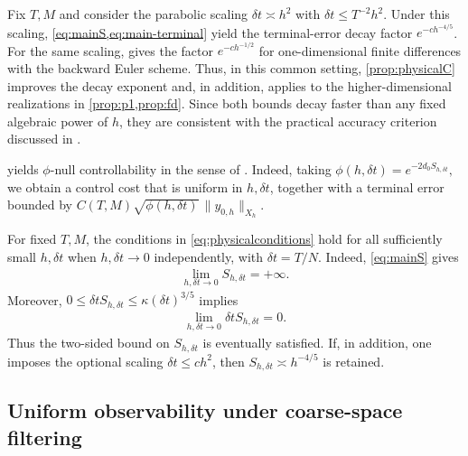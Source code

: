 \documentclass[print,wide,eng]{draft}
\begin{document}
%
\begin{remark}\label{rem:fully-discrete-comparison}
Fix $T,M$ and consider the parabolic scaling $\delta t\asymp h^2$ with $\delta t\le T^{-2}h^2$. Under this scaling, \cref{eq:mainS,eq:main-terminal} yield the terminal-error decay factor $e^{-ch^{-4/5}}$. For the same scaling, \cite[Proposition~3.1 and Theorem~1.10]{GCH} gives the factor $e^{-ch^{-1/2}}$ for one-dimensional finite differences with the backward Euler scheme. Thus, in this common setting, \cref{prop:physicalC} improves the decay exponent and, in addition, applies to the higher-dimensional realizations in \cref{prop:p1,prop:fd}. Since both bounds decay faster than any fixed algebraic power of $h$, they are consistent with the practical accuracy criterion discussed in \cite[Remark~4.4]{Boyer2014}.
\end{remark}
%

%
\begin{remark}
 yields $\phi$-null controllability in the sense of \cite[Definition~2.1 and Theorem~3.2]{Boyer2013}. Indeed, taking
$\phi(h,\delta t)=e^{-2d_0S_{h,\delta t}},$
we obtain a control cost that is uniform in $h,\delta t$, together with a terminal error bounded by $C(T,M)\sqrt{\phi(h,\delta t)}\,\|y_{0,h}\|_{X_h}$.
\end{remark}
%

\begin{remark}
For fixed $T,M$, the conditions in \cref{eq:physicalconditions} hold for all sufficiently small $h,\delta t$ when $h,\delta t\to0$ independently, with $\delta t=T/N$. Indeed, \cref{eq:mainS} gives
\begin{align*}
\lim_{h,\delta t\to0}S_{h,\delta t}=+\infty.
\end{align*}
Moreover, $0\leq\delta t S_{h,\delta t}\leq\kappa(\delta t)^{3/5}$ implies
\begin{align*}
\lim_{h,\delta t\to0}\delta t S_{h,\delta t}=0.
\end{align*}
Thus the two-sided bound on $S_{h,\delta t}$ is eventually satisfied. If, in addition, one imposes the optional scaling $\delta t\le ch^2$, then $S_{h,\delta t}\asymp h^{-4/5}$ is retained.
\end{remark}

\subsection{Uniform observability under coarse-space filtering}\label{sec:filtering}
\end{document}

